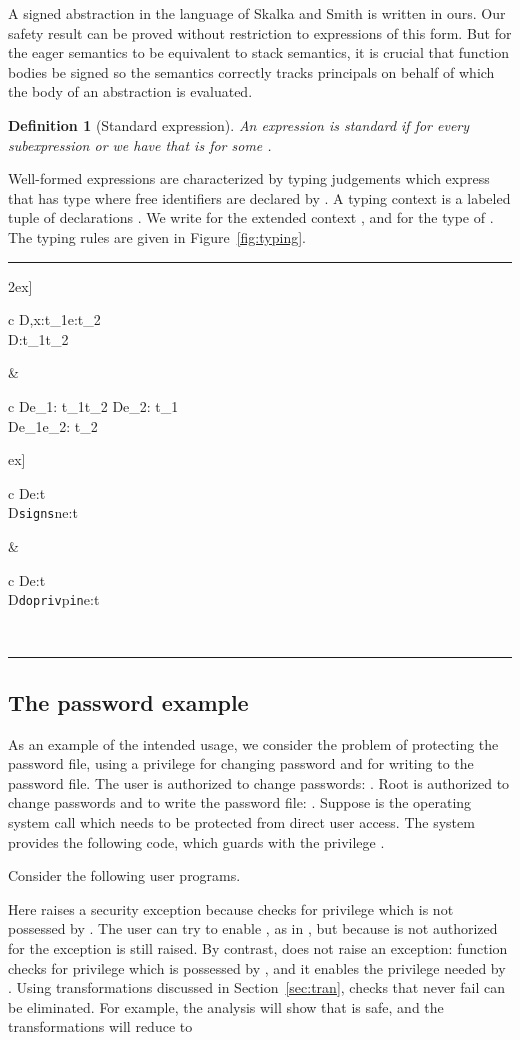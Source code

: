 \documentclass[submission,copyright,creativecommons]{eptcs}
\newcommand{\Rule}[2]{          \begin{array}{c}
  #1 \\\hline
  #2
  \end{array}}
\newcommand{\enable}[2]{\ENABLE\;#1\;\IN\;#2}
\newcommand{\signs}[2]{\SIGNS\;#1\;#2}
\newcommand{\IN}{\mbox{\texttt{in}}}
\newcommand{\proves}{\vdash}
\newcommand{\ENABLE}{\mbox{\texttt{dopriv}}}
\newcommand{\SIGNS}{\mbox{\texttt{signs}}}
\newcommand{\LAM}[2]{{\mathtt{fun}\; #1.\; #2}}
\newcommand{\D}{D} \newcommand{\ty}{t} \renewcommand{\th}{\theta}
\newcommand{\n}{n} \newcommand{\p}{p} \newcommand{\Ps}{\Pi} \newcommand{\h}{h}
\newtheorem{definition}[theorem]{Definition}
\begin{document}
A signed abstraction  in the language of Skalka and
Smith is written  in ours.  Our
safety result can be proved without restriction to expressions of this
form.  But for the eager semantics to be equivalent to stack
semantics, it is crucial that function bodies be signed so the
semantics correctly tracks principals on behalf of which the body of
an abstraction is evaluated.

\begin{definition}[Standard expression]\label{def:std}
An expression is standard if for every subexpression
 or  we have that  is
 for some .
\end{definition}



Well-formed expressions are characterized by typing judgements
 which express that  has type  where free
identifiers are declared by .  A typing context  is a labeled
tuple of declarations . We write
 for the extended context , and  for the type of .  The typing rules are given in
Figure~\ref{fig:typing}.

\begin{figure*}
\hrule
\medskip
2ex]
\Rule{\D,x:\ty_1\proves e:\ty_2}
     {\D\proves\LAM{x}{e}:\ty_1\to\ty_2} &
\Rule{\D\proves e_1: \ty_1\to\ty_2\qquad 
      \D\proves e_2: \ty_1}
     {\D\proves e_1\;e_2: \ty_2} 
\2ex]
\Rule{\D\proves e:\ty}
     {\D\proves \signs{\n}{e}:\ty} &
\Rule{\D\proves e:\ty}
     {\D\proves \enable{\p}{e}:\ty} 
\
\medskip
\hrule
\medskip
\caption{Typing rules.}
\label{fig:typing}
\end{figure*}


\subsection{The password example}
\label{sec:pass}

As an example of the intended usage, we consider the problem of protecting the
password file, using a privilege  for changing password and  for writing to
the password file.
The user is authorized to change passwords:
.
Root is authorized to change passwords and to write the password file:
.
Suppose  is the operating system call which needs to be protected from
direct user access. The system provides the following code, which guards
 with the privilege .

Consider the following user programs.

Here  raises a security exception because  checks for privilege 
which is not possessed by .  The user can try to enable , as in , but
because  is not authorized for  the exception is still raised.  By contrast,
 does not raise an exception: function  checks for privilege 
which is possessed by , and it enables the privilege  needed by
.  
Using transformations discussed in Section~\ref{sec:tran}, checks that never fail can
be eliminated. 
For example, the analysis will show that  is safe, and the transformations will
reduce  to 
\end{document}
